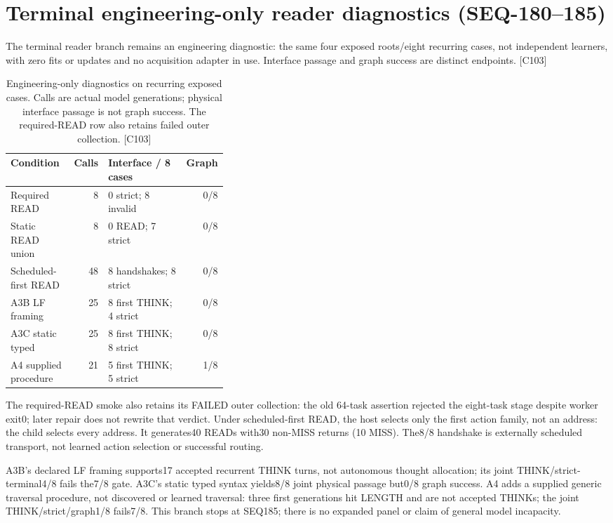 \documentclass{article}
\begin{document}
\section{Terminal engineering-only reader diagnostics (SEQ-180--185)}
The terminal reader branch remains an engineering diagnostic: the same four
exposed roots/eight recurring cases, not independent learners, with zero fits
or updates and no acquisition adapter in use. Interface passage and graph
success are distinct endpoints. [C103]

\begin{table}[ht]
\centering\small
\begin{tabular}{lrp{0.36\linewidth}r}
\toprule
Condition & Calls & Interface / 8 cases & Graph \\
\midrule
Required READ & 8 & 0 strict; 8 invalid & 0/8 \\
Static READ union & 8 & 0 READ; 7 strict & 0/8 \\
Scheduled-first READ & 48 & 8 handshakes; 8 strict & 0/8 \\
A3B LF framing & 25 & 8 first THINK; 4 strict & 0/8 \\
A3C static typed & 25 & 8 first THINK; 8 strict & 0/8 \\
A4 supplied procedure & 21 & 5 first THINK; 5 strict & 1/8 \\
\bottomrule
\end{tabular}
\caption{Engineering-only diagnostics on recurring exposed cases. Calls are
actual model generations; physical interface passage is not graph success.
The required-READ row also retains failed outer collection. [C103]}
\end{table}

The required-READ smoke also retains its FAILED outer collection: the old
64-task assertion rejected the eight-task stage despite worker exit0; later
repair does not rewrite that verdict. Under scheduled-first READ, the host
selects only the first action family, not an address: the child selects every
address. It generates40 READs with30 non-MISS returns (10 MISS). The8/8
handshake is externally scheduled transport, not learned action selection or
successful routing.

A3B's declared LF framing supports17 accepted recurrent THINK turns, not
autonomous thought allocation; its joint THINK/strict-terminal4/8 fails the7/8
gate. A3C's static typed syntax yields8/8 joint physical passage but0/8 graph
success. A4 adds a supplied generic traversal procedure, not discovered or
learned traversal: three first generations hit LENGTH and are not accepted
THINKs; the joint THINK/strict/graph1/8 fails7/8. This branch stops at SEQ185;
there is no expanded panel or claim of general model incapacity.
\end{document}
